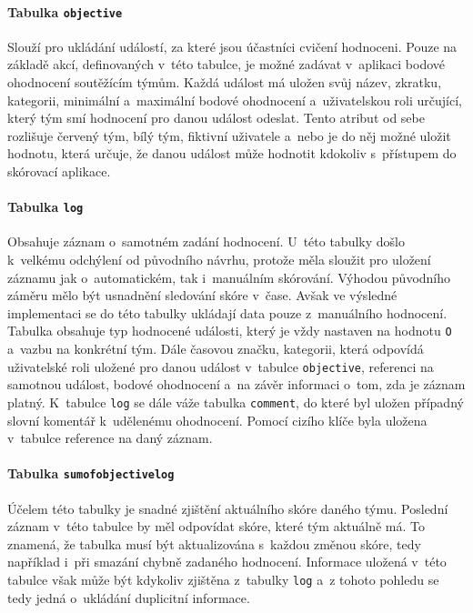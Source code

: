 \documentclass[
  digital,
  twoside,
  table, 
  nolof, 
  nolot
]{fithesis3}
\begin{document}
\paragraph{Tabulka \texttt{objective}} Slouží pro ukládání událostí, za které jsou účastníci cvičení hodnoceni. Pouze na základě akcí, definovaných v~této tabulce, je možné zadávat v~aplikaci bodové ohodnocení soutěžícím týmům. Každá událost má uložen svůj název, zkratku, kategorii, minimální a~maximální bodové ohodnocení a~uživatelskou roli určující, který tým smí hodnocení pro danou událost odeslat. Tento atribut od sebe rozlišuje červený tým, bílý tým, fiktivní uživatele a~nebo je do něj možné uložit hodnotu, která určuje, že danou událost může hodnotit kdokoliv s~přístupem do skórovací aplikace.

\paragraph{Tabulka \texttt{log}} Obsahuje záznam o~samotném zadání hodnocení. U~této tabulky došlo k~velkému odchýlení od původního návrhu, protože měla sloužit pro uložení záznamu jak o~automatickém, tak i~manuálním skórování. Výhodou původního záměru mělo být usnadnění sledování skóre v~čase. Avšak ve výsledné implementaci se do této tabulky ukládají data pouze z~manuálního hodnocení. Tabulka obsahuje typ hodnocené události, který je vždy nastaven na hodnotu \texttt{O} a~vazbu na konkrétní tým. Dále časovou značku, kategorii, která odpovídá uživatelské roli uložené pro danou událost v~tabulce \texttt{objective}, referenci na samotnou událost, bodové ohodnocení a~na závěr informaci o~tom, zda je záznam platný. K~tabulce \texttt{log} se dále váže tabulka \texttt{comment}, do které byl uložen případný slovní komentář k~udělenému ohodnocení. Pomocí cizího klíče byla uložena v~tabulce reference na daný záznam.

\paragraph{Tabulka \texttt{sumofobjectivelog}} Účelem této tabulky je snadné zjištění aktuálního skóre daného týmu. Poslední záznam v~této tabulce by měl odpovídat skóre, které tým aktuálně má. To znamená, že tabulka musí být aktualizována s~každou změnou skóre, tedy například i~při smazání chybně zadaného hodnocení. Informace uložená v~této tabulce však může být kdykoliv zjištěna z~tabulky \texttt{log} a~z tohoto pohledu se tedy jedná o~ukládání duplicitní informace.
\end{document}
